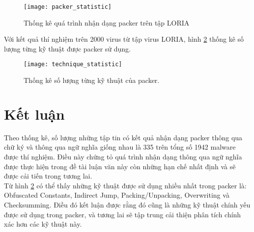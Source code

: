\begin{figure}
\centering
\texttt{[image: packer\_statistic]}
\caption{Thống kê quá trình nhận dạng packer trên tập LORIA}
\label{fig:PackerStat}
\end{figure}

\hspace{0.5cm}Với kết quả thí nghiệm trên 2000 virus từ tập virus LORIA, hình \ref {fig:TechStat} thống kê số lượng từng kỹ thuật được packer sử dụng.

\begin{figure}
\centering
\texttt{[image: technique\_statistic]}
\caption{Thống kê số lượng từng kỹ thuật của packer.}
\label{fig:TechStat}
\end{figure}

\section{Kết luận}

\hspace{0.5cm}Theo thống kê, số lượng những tập tin có kết quả nhận dạng packer thông qua chữ ký và thông qua ngữ nghĩa giống nhau là 335 trên tổng số 1942 malware được thí nghiệm. Điều này chứng tỏ quá trình nhận dạng thông qua ngữ nghĩa được thực hiện trong đề tài luận văn này còn những hạn chế nhất định và sẽ được cải tiến trong tương lai.\\

\hspace{0.5cm}Từ hình \ref {fig:TechStat} có thể thấy những kỹ thuật được sử dụng nhiều nhất trong packer là: Obfuscated Constants, Indirect Jump, Packing/Unpacking, Overwriting và Checksumming. Điều đó kết luận được rằng đó cũng là những kỹ thuật chính yếu được sử dụng trong packer, và tương lai sẽ tập trung cải thiện phân tích chính xác hơn các kỹ thuật này.

